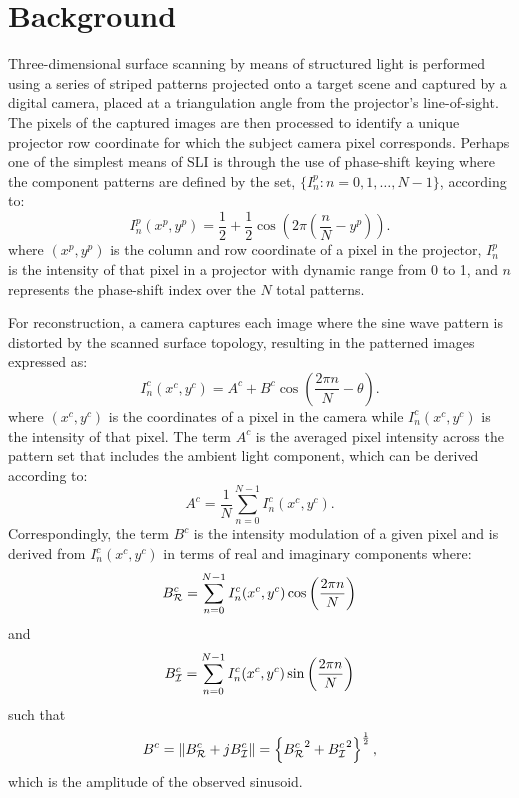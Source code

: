 \documentclass[10pt]{article}
\begin{document}
\section{Background}
\noindent Three-dimensional surface scanning by means of structured light is performed using a series of striped patterns projected onto a target scene and captured by a digital camera, placed at a triangulation angle from the projector's line-of-sight.  The pixels of the captured images are then processed to identify a unique projector row coordinate for which the subject camera pixel corresponds. Perhaps one of the simplest means of SLI is through the use of phase-shift keying where the component patterns are defined by the set, $\{I^p_n:n=0,1,\ldots,N-1\}$, according to:
\begin{equation}
    \label{EQ:ProjectorPattern}
    I^p_n(x^p, y^p) = \frac{1}{2} + \frac{1}{2} \cos \left( 2\pi (\frac{n}{N}-y^p)\right).
\end{equation}
where $(x^p, y^p)$ is the column and row coordinate of a pixel in the projector, $I_n^p$ is the intensity of that pixel in a projector with dynamic range from 0 to 1, and $n$ represents the phase-shift index over the $N$ total patterns.

For reconstruction, a camera captures each image where the sine wave pattern is distorted by the scanned surface topology, resulting in the patterned images expressed as:
\begin{equation}
    I_n^c(x^c, y^c) = A^c + B^c \cos\left( \frac{2\pi n}{N} - \theta \right).
    \label{EQ:CameraPattern}
\end{equation}
where $(x^c, y^c)$ is the coordinates of a pixel in the camera while $I_n^c(x^c, y^c)$ is the intensity of that pixel. The term $A^c$ is the averaged pixel intensity across the pattern set that includes the ambient light component, which can be derived according to:
\begin{equation}
    A^c = \frac{1}{N}\sum_{n=0}^{N-1}I_n^c(x^c, y^c).
    \label{EQ:Ac}
\end{equation}
Correspondingly, the term $B^c$ is the intensity modulation of a given pixel and is derived from $I_n^c(x^c, y^c)$ in terms of real and imaginary components where: 
\begin{equation}
    B^c_{\cal R}  =  \sum_{n=0}^{N-1}I_n^c(x^c, y^c) \cos\left(\frac{2\pi n}{N}\right)
    \label{bcCosEqn}
\end{equation}
and
\begin{equation}
    B^c_{\cal I}  =  \sum_{n=0}^{N-1}I_n^c(x^c, y^c) \sin\left(\frac{2\pi n}{N}\right)
    \label{bcSinEqn}
\end{equation}
such that 
\begin{equation}
    B^c  =  \left\| {B^c_{\cal R}}+j{B^c_{\cal I}}   \right\| =  \left\{ {B^c_{\cal R}}^2+{B^c_{\cal I}}^2 \right\}^\frac{1}{2},
\end{equation}
which is the amplitude of the observed sinusoid.
\end{document}
